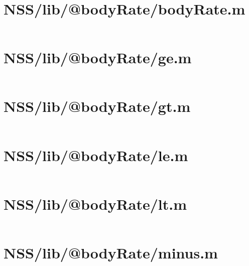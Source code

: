 \pagebreak
\section*{NSS/lib/@bodyRate/bodyRate.m}\label{code:NSS/lib/@bodyRate/bodyRate.m}
\inputminted[linenos,fontsize=\scriptsize]{matlab}{/home/dcouture/git/mathyourlife/TSatPy/beta_versions/matlab_object_oriented/lib/@bodyRate/bodyRate.m}

\pagebreak
\section*{NSS/lib/@bodyRate/ge.m}\label{code:NSS/lib/@bodyRate/ge.m}
\inputminted[linenos,fontsize=\scriptsize]{matlab}{/home/dcouture/git/mathyourlife/TSatPy/beta_versions/matlab_object_oriented/lib/@bodyRate/ge.m}

\pagebreak
\section*{NSS/lib/@bodyRate/gt.m}\label{code:NSS/lib/@bodyRate/gt.m}
\inputminted[linenos,fontsize=\scriptsize]{matlab}{/home/dcouture/git/mathyourlife/TSatPy/beta_versions/matlab_object_oriented/lib/@bodyRate/gt.m}

\pagebreak
\section*{NSS/lib/@bodyRate/le.m}\label{code:NSS/lib/@bodyRate/le.m}
\inputminted[linenos,fontsize=\scriptsize]{matlab}{/home/dcouture/git/mathyourlife/TSatPy/beta_versions/matlab_object_oriented/lib/@bodyRate/le.m}

\pagebreak
\section*{NSS/lib/@bodyRate/lt.m}\label{code:NSS/lib/@bodyRate/lt.m}
\inputminted[linenos,fontsize=\scriptsize]{matlab}{/home/dcouture/git/mathyourlife/TSatPy/beta_versions/matlab_object_oriented/lib/@bodyRate/lt.m}

\pagebreak
\section*{NSS/lib/@bodyRate/minus.m}\label{code:NSS/lib/@bodyRate/minus.m}
\inputminted[linenos,fontsize=\scriptsize]{matlab}{/home/dcouture/git/mathyourlife/TSatPy/beta_versions/matlab_object_oriented/lib/@bodyRate/minus.m}

\pagebreak
